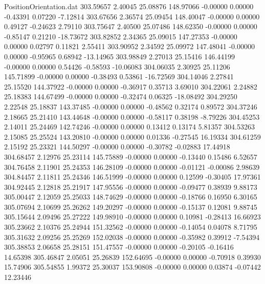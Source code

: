 \begin{filecontents}{PositionOrientation.dat}
 303.59657    2.40045   25.08876   148.97066   -0.00000    0.00000   -0.43391    0.07220   -7.12814
 303.67656    2.36574   25.09454   148.40047   -0.00000    0.00000    0.49127   -0.24623    2.79110
 303.75647    2.40500   25.07486   148.62350   -0.00000    0.00000   -0.85147    0.21210  -18.73672
 303.82852    2.34365   25.09015   147.27353   -0.00000    0.00000    0.02797    0.11821    2.55411
 303.90952    2.34592   25.09972   147.48041   -0.00000    0.00000   -0.95965    0.68942  -13.14965
 303.98849    2.27013   25.15416   146.44199   -0.00000    0.00000    0.54426   -0.58593  -10.06083
 304.06035    2.30925   25.11206   145.71899   -0.00000    0.00000   -0.38493    0.53861  -16.72569
 304.14046    2.27841   25.15520   144.37922   -0.00000    0.00000   -0.36917    0.35713    3.69010
 304.22061    2.24882   25.18383   144.67499   -0.00000    0.00000   -0.32474    0.06325  -18.08492
 304.29250    2.22548   25.18837   143.37485   -0.00000    0.00000   -0.48562    0.32174    0.89572
 304.37246    2.18665   25.21410   143.44648   -0.00000    0.00000   -0.58117    0.38198   -8.79226
 304.45253    2.14011   25.24469   142.74246   -0.00000    0.00000    0.13412    0.13174    5.81357
 304.53263    2.15085   25.25524   143.20810   -0.00000    0.00000    0.01336   -0.27545   16.19334
 304.61259    2.15192   25.23321   144.50297   -0.00000    0.00000   -0.30782   -0.02883   17.44918
 304.68457    2.12976   25.23114   145.75889   -0.00000    0.00000   -0.13440    0.15486    6.52657
 304.76458    2.11901   25.24353   146.28109   -0.00000    0.00000   -0.01121   -0.00086    2.98639
 304.84457    2.11811   25.24346   146.51999   -0.00000    0.00000    0.12599   -0.30405   17.97361
 304.92445    2.12818   25.21917   147.95556   -0.00000    0.00000   -0.09477    0.38939    9.88173
 305.00447    2.12059   25.25033   148.74629   -0.00000    0.00000   -0.18766    0.16950    6.30165
 305.07694    2.10699   25.26262   149.20297   -0.00000    0.00000   -0.15137    0.12081    9.88745
 305.15644    2.09496   25.27222   149.98910   -0.00000    0.00000    0.10981   -0.28413   16.66923
 305.23662    2.10376   25.24944   151.32562   -0.00000    0.00000   -0.14054    0.04078    8.71795
 305.31632    2.09256   25.25269   152.02038   -0.00000    0.00000   -0.35982    0.39912   -7.54394
 305.38853    2.06658   25.28151   151.47557   -0.00000    0.00000   -0.20105   -0.16416   14.65398
 305.46847    2.05051   25.26839   152.64695   -0.00000    0.00000   -0.70918    0.39930   15.74906
 305.54855    1.99372   25.30037   153.90808   -0.00000    0.00000    0.03874   -0.07442   12.23446

\end{filecontents}
